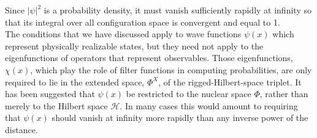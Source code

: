 \documentclass[cyan]{elegantnote}
\begin{document}
Since $|\psi|^2$ is a probability density, it must vanish sufficiently rapidly at infinity so that its integral over all configuration space is convergent and equal to 1. \\
The conditions that we have discussed apply to wave functions $\psi(x)$ which represent physically realizable states, but they need not apply to the eigenfunctions of operators that represent observables. Those eigenfunctions, $\chi(x)$, which play the role of filter functions in computing probabilities, are only required to lie in the extended space, $\Phi^X$, of the rigged-Hilbert-space triplet. It has been suggested that $\psi(x)$ be restricted to the nuclear space $\Phi$, rather than merely to the Hilbert space $\mathcal{H}$. In many cases this would amount to requiring that $\psi(x)$ should vanish at infinity more rapidly than any inverse power of the distance. 
\end{document}
